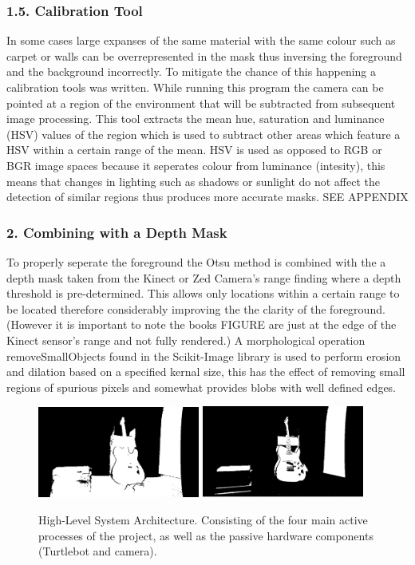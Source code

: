 \documentclass{mproj}
\begin{document}
\subsubsection{1.5. Calibration Tool}

In some cases large expanses of the same material with the same colour such as carpet or walls can be overrepresented in the mask thus inversing the foreground and the background incorrectly. To mitigate the chance of this happening a calibration tools was written. While running this program the camera can be pointed at a region of the environment that will be subtracted from subsequent image processing. This tool extracts the mean hue, saturation and luminance (HSV) values of the region which is used to subtract other areas which feature a HSV within a certain range of the mean. HSV is used as opposed to RGB or BGR image spaces because it seperates colour from luminance (intesity), this means that changes in lighting such as shadows or sunlight do not affect the detection of similar regions thus produces more accurate masks. SEE APPENDIX


\subsubsection{2. Combining with a Depth Mask}

To properly seperate the foreground the Otsu method is combined with the a depth mask taken from the Kinect or Zed Camera's range finding where a depth threshold is pre-determined. This allows only locations within a certain range to be located therefore considerably improving the the clarity of the foreground. (However it is important to note the books FIGURE are just at the edge of the Kinect sensor's range and not fully rendered.) A morphological operation removeSmallObjects found in the Scikit-Image library is used to perform erosion and dilation based on a specified kernal size, this has the effect of removing small regions of spurious pixels and somewhat provides blobs with well defined edges.

\begin{figure}
   \caption{High-Level System Architecture. Consisting of the four main active processes of the project, as well as the passive hardware components (Turtlebot and camera).}
   \centering
   \includegraphics[width=0.475\textwidth]{images/depth.png}
   \hfill
   \includegraphics[width=0.475\textwidth]{images/combined.png}
\end{figure}
\end{document}
